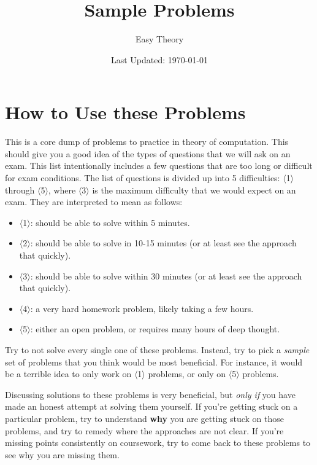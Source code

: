 \documentclass[]{article}
\title{Sample Problems}
\author{Easy Theory}
\date{Last Updated: \today}
\newcommand{\Level}[1]{{\color{blue} $\langle$#1$\rangle$}}
\begin{document}
\maketitle

\section*{How to Use these Problems}

This is a core dump of problems to practice in theory of computation.
This should give you a good idea of the types of questions that we will ask on an exam.
This list intentionally includes a few questions that are too long or difficult for exam conditions.
The list of questions is divided up into 5 difficulties: \Level{1} through \Level{5}, where \Level{3} is the maximum difficulty that we would expect on an exam. They are interpreted to mean as follows:
\begin{itemize}
	\item \Level{1}: should be able to solve within 5 minutes.
	\item \Level{2}: should be able to solve in 10-15 minutes (or at least see the approach that quickly).
	\item \Level{3}: should be able to solve within 30 minutes (or at least see the approach that quickly).
	\item \Level{4}: a very hard homework problem, likely taking a few hours.
	\item \Level{5}: either an open problem, or requires many hours of deep thought.
\end{itemize}

Try to not solve every single one of these problems. 
Instead, try to pick a \textit{sample} set of problems that you think would be most beneficial.
For instance, it would be a terrible idea to only work on \Level{1} problems, or only on \Level{5} problems. 

Discussing solutions to these problems is very beneficial, but \textit{only if} you have made an honest attempt at solving them yourself.
If you're getting stuck on a particular problem, try to understand \textbf{why} you are getting stuck on those problems, and try to remedy where the approaches are not clear.
If you're missing points consistently on coursework, try to come back to these problems to see why you are missing them.

\end{document}
